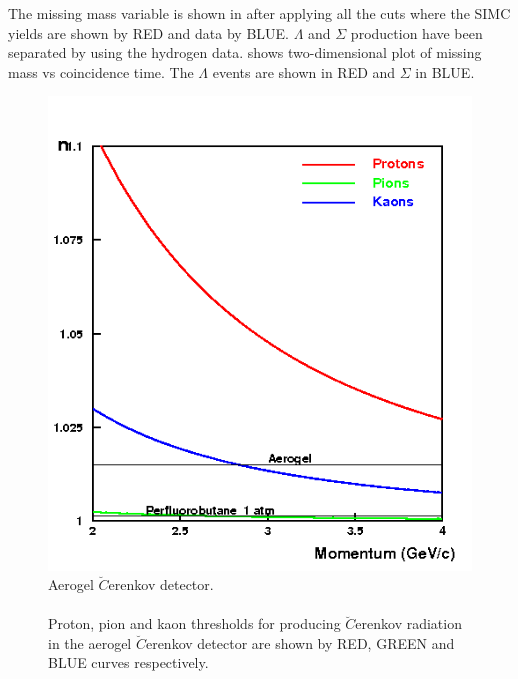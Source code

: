 The missing mass variable is shown in  after applying all the cuts where the SIMC yields are shown by RED and data by BLUE. $\Lambda$ and $\Sigma$ production have been separated by using the hydrogen data.  shows two-dimensional plot of missing mass vs coincidence time. The $\Lambda$ events are shown in RED and $\Sigma$ in BLUE.

\begin{figure}[!tbp]
  \centering
  \includegraphics[width=0.8\columnwidth]{pid1}
  \caption[Aerogel $\breve{C}$erenkov detector.]{\label{fig:pid1}Aerogel $\breve{C}$erenkov detector.\\\\ Proton, pion and kaon thresholds for producing $\breve{C}$erenkov radiation in the aerogel $\breve{C}$erenkov detector are shown by RED, GREEN and BLUE curves respectively.}
\end{figure}

